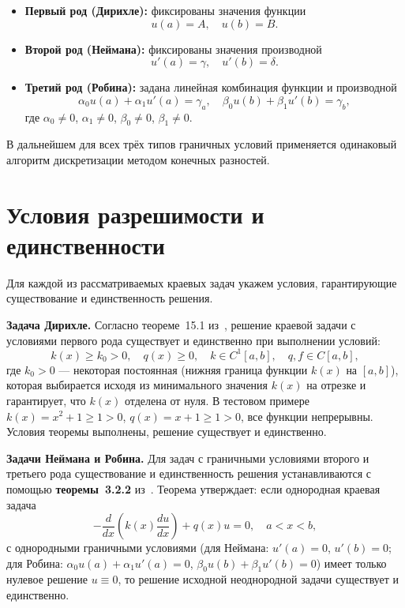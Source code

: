 \documentclass[14pt,a4paper]{extarticle}  %
\numberwithin{equation}{section}
\begin{document}
\begin{itemize}
    \item \textbf{Первый род (Дирихле):} фиксированы значения функции
    \begin{equation}
        u(a) = A, \quad u(b) = B.
    \end{equation}
    \item \textbf{Второй род (Неймана):} фиксированы значения производной
    \begin{equation}
        u'(a) = \gamma, \quad u'(b) = \delta.
    \end{equation}
    \item \textbf{Третий род (Робина):} задана линейная комбинация функции и производной
    \begin{equation}
        \alpha_0 u(a) + \alpha_1 u'(a) = \gamma_a, \quad \beta_0 u(b) + \beta_1 u'(b) = \gamma_b,
    \end{equation}
    где $\alpha_0 \neq 0$, $\alpha_1 \neq 0$, $\beta_0 \neq 0$, $\beta_1 \neq 0$.
\end{itemize}

В дальнейшем для всех трёх типов граничных условий применяется одинаковый алгоритм дискретизации методом конечных разностей.

\newpage
\section{Условия разрешимости и единственности}

Для каждой из рассматриваемых краевых задач укажем условия, гарантирующие существование и единственность решения.

\textbf{Задача Дирихле.} Согласно теореме~15.1 из~\cite{amosov_dubinsky_kopchenova_1994}, решение краевой задачи с условиями первого рода существует и единственно при выполнении условий:
\[
k(x) \ge k_0 > 0, \quad q(x) \ge 0, \quad k \in C^1[a,b], \quad q,f \in C[a,b],
\]
где $k_0 > 0$ — некоторая постоянная (нижняя граница функции $k(x)$ на $[a,b]$), которая выбирается исходя из минимального значения $k(x)$ на отрезке и гарантирует, что $k(x)$ отделена от нуля.
В тестовом примере $k(x) = x^2 + 1 \ge 1 > 0$, $q(x) = x + 1 \ge 1 > 0$, все функции непрерывны. Условия теоремы выполнены, решение существует и единственно.

\textbf{Задачи Неймана и Робина.} Для задач с граничными условиями второго и третьего рода существование и единственность решения устанавливаются с помощью \textbf{теоремы~3.2.2} из~\cite{denisov_razgulin_2009}. Теорема утверждает: если однородная краевая задача
\[
-\frac{d}{dx}\left(k(x)\frac{du}{dx}\right) + q(x)u = 0, \quad a < x < b,
\]
с однородными граничными условиями (для Неймана: $u'(a)=0$, $u'(b)=0$; для Робина: $\alpha_0 u(a)+\alpha_1 u'(a)=0$, $\beta_0 u(b)+\beta_1 u'(b)=0$) имеет только нулевое решение $u \equiv 0$, то решение исходной неоднородной задачи существует и единственно.
\end{document}
